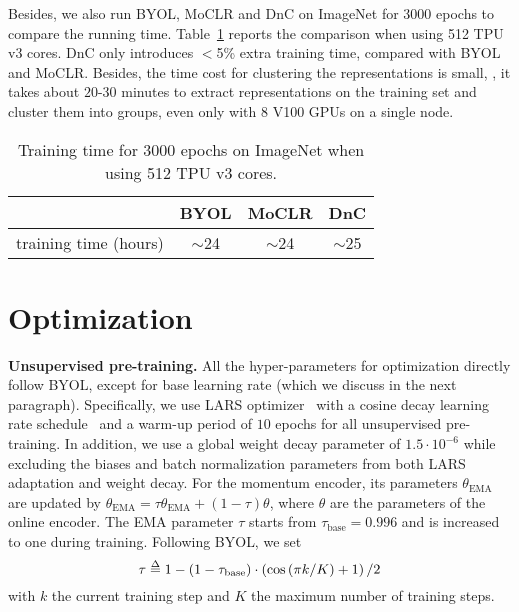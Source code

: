 \documentclass[final]{cvpr}
\def\delequal{\mathrel{\ensurestackMath{\stackon[1pt]{=}{\scriptstyle\Delta}}}}
\newcommand{\pa}[1]{\left(#1\right)}
\begin{document}
Besides, we also run BYOL, MoCLR and DnC on ImageNet for 3000 epochs to compare the running time. Table~\ref{tab:time} reports the comparison when using 512 TPU v3 cores. DnC only introduces $<$5\% extra training time, compared with BYOL and MoCLR. Besides, the time cost for clustering the representations is small, \eg, it takes about $20$-$30$ minutes to extract representations on the training set and cluster them into groups, even only with $8$ V100 GPUs on a single node.

\begin{table}[h]
\caption{Training time for 3000 epochs on ImageNet when using 512 TPU v3 cores.}
\label{tab:time}
\setlength{\tabcolsep}{4.5pt}
\begin{center}
\begin{small}
\begin{tabular}{c|ccc}
\toprule
                     & BYOL  & MoCLR & DnC \\
\midrule
training time (hours) & $\sim$24 & $\sim$24 & $\sim$25 \\
\bottomrule
\end{tabular}
\end{small}
\end{center}
\end{table}


\section{Optimization}

\noindent\textbf{Unsupervised pre-training.} All the hyper-parameters for optimization directly follow BYOL, except for base learning rate (which we discuss in the next paragraph). Specifically, we use LARS optimizer~\cite{LARS} with a cosine decay learning rate schedule~\cite{SGDR} and a warm-up period of $10$ epochs for all unsupervised pre-training. 
In addition, we use a global weight decay parameter of $1.5\cdot10^{-6}$ while excluding the biases and batch normalization parameters from both LARS adaptation and weight decay. For the momentum encoder, its parameters $\theta_\text{EMA}$ are updated by $\theta_\text{EMA}=\tau\theta_\text{EMA} + (1-\tau)\theta$, where $\theta$ are the parameters of the online encoder. The EMA parameter $\tau$ starts from $\tau_\text{base} = 0.996$ and is increased to one during training. Following BYOL, we set 
\vspace{-3pt}
\begin{equation}\label{eq:tau}
\tau \delequal 1 - (1-\tau_\text{base})\cdot \pa{\cos\pa{\pi k / K} + 1} / 2
\end{equation}
\vspace{-3pt}
with $k$ the current training step and $K$ the maximum number of training steps. 
\end{document}

